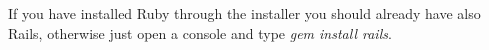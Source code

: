 If you have installed Ruby through the installer you should already have also Rails, otherwise just open a console and type \emph{gem install rails}.